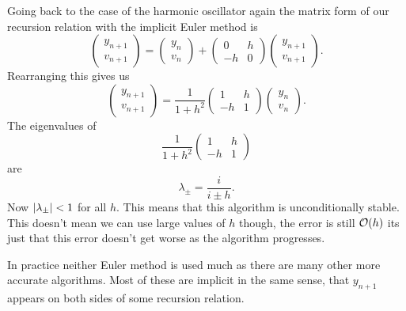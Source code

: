 \documentclass[a4paper]{article}
\begin{document}
    Going back to the case of the harmonic oscillator again the matrix form of our recursion relation with the implicit Euler method is
    \[
        \begin{pmatrix}
            y_{n+1}\\ v_{n+1}
        \end{pmatrix}
        =
        \begin{pmatrix}
            y_n\\ v_n
        \end{pmatrix}
        +
        \begin{pmatrix}
            0 & h\\
            -h & 0
        \end{pmatrix}
        \begin{pmatrix}
            y_{n+1}\\ v_{n+1}
        \end{pmatrix}
        .
    \]
    Rearranging this gives us
    \[
        \begin{pmatrix}
            y_{n+1}\\ v_{n+1}
        \end{pmatrix}
        = \frac{1}{1 + h^2}
        \begin{pmatrix}
            1 & h\\
            -h & 1
        \end{pmatrix}
        \begin{pmatrix}
            y_n\\ v_n
        \end{pmatrix}
        .
    \]
    The eigenvalues of
    \[
        \frac{1}{1 + h^2}
        \begin{pmatrix}
            1 & h\\
            -h & 1
        \end{pmatrix}
    \]
    are
    \[\lambda_{\pm} = \frac{i}{i \pm h}.\]
    Now \(\abs{\lambda_{\pm}} < 1\) for all \(h\).
    This means that this algorithm is unconditionally stable.
    This doesn't mean we can use large values of \(h\) though, the error is still \(\order{h}\) its just that this error doesn't get worse as the algorithm progresses.
    
    In practice neither Euler method is used much as there are many other more accurate algorithms.
    Most of these are implicit in the same sense, that \(y_{n+1}\) appears on both sides of some recursion relation.
    
\end{document}
